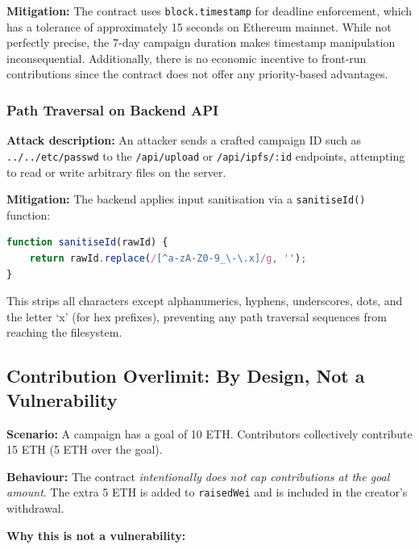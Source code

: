 \textbf{Mitigation:} The contract uses \texttt{block.timestamp} for deadline enforcement, which has a tolerance of approximately 15 seconds on Ethereum mainnet. While not perfectly precise, the 7-day campaign duration makes timestamp manipulation inconsequential. Additionally, there is no economic incentive to front-run contributions since the contract does not offer any priority-based advantages.

\subsubsection{Path Traversal on Backend API}

\textbf{Attack description:} An attacker sends a crafted campaign ID such as \texttt{../../etc/passwd} to the \texttt{/api/upload} or \texttt{/api/ipfs/:id} endpoints, attempting to read or write arbitrary files on the server.

\textbf{Mitigation:} The backend applies input sanitisation via a \texttt{sanitiseId()} function:
\begin{lstlisting}[language=JavaScript]
function sanitiseId(rawId) {
    return rawId.replace(/[^a-zA-Z0-9_\-\.x]/g, '');
}
\end{lstlisting}

This strips all characters except alphanumerics, hyphens, underscores, dots, and the letter `x' (for hex prefixes), preventing any path traversal sequences from reaching the filesystem.

\subsection{Contribution Overlimit: By Design, Not a Vulnerability}
\label{subsec:overlimit}

\textbf{Scenario:} A campaign has a goal of 10 ETH. Contributors collectively contribute 15 ETH (5 ETH over the goal).

\textbf{Behaviour:} The contract \emph{intentionally does not cap contributions at the goal amount}. The extra 5 ETH is added to \texttt{raisedWei} and is included in the creator's withdrawal.

\textbf{Why this is not a vulnerability:}

